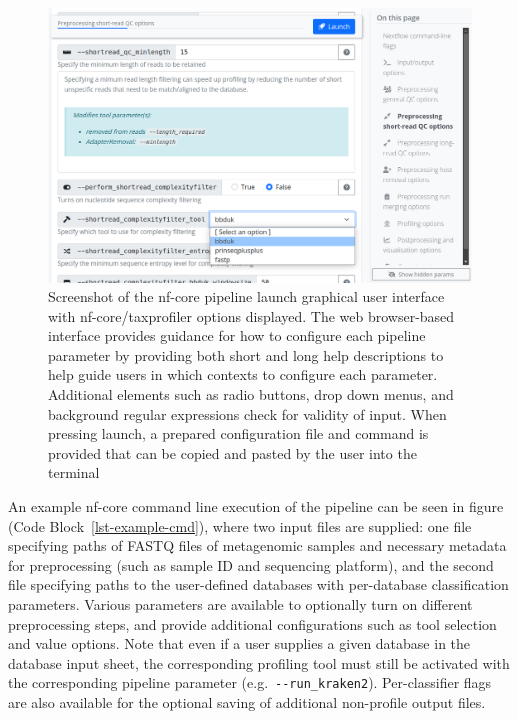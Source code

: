 \documentclass[
]{article}
\begin{document}
\begin{figure}

{\centering \includegraphics{taxprofiler_launchpage.png}

}

\caption{\label{fig-launch-page}Screenshot of the nf-core pipeline
launch graphical user interface with nf-core/taxprofiler options
displayed. The web browser-based interface provides guidance for how to
configure each pipeline parameter by providing both short and long help
descriptions to help guide users in which contexts to configure each
parameter. Additional elements such as radio buttons, drop down menus,
and background regular expressions check for validity of input. When
pressing launch, a prepared configuration file and command is provided
that can be copied and pasted by the user into the terminal}

\end{figure}

An example nf-core command line execution of the pipeline can be seen in
figure (Code Block~\ref{lst-example-cmd}), where two input files are
supplied: one file specifying paths of FASTQ files of metagenomic
samples and necessary metadata for preprocessing (such as sample ID and
sequencing platform), and the second file specifying paths to the
user-defined databases with per-database classification parameters.
Various parameters are available to optionally turn on different
preprocessing steps, and provide additional configurations such as tool
selection and value options. Note that even if a user supplies a given
database in the database input sheet, the corresponding profiling tool
must still be activated with the corresponding pipeline parameter
(e.g.~\texttt{-\/-run\_kraken2}). Per-classifier flags are also
available for the optional saving of additional non-profile output
files.
\end{document}
